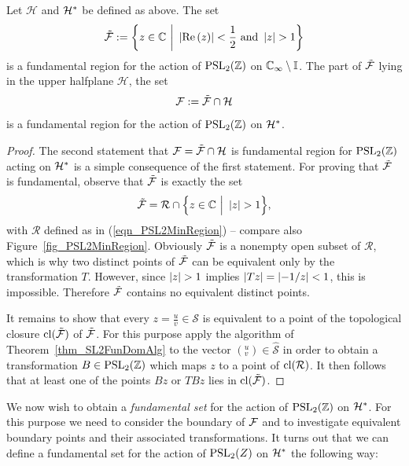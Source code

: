 \begin{theorem}
\label{thm_PSL2FunDom}
Let $\mathcal{H}$ and $\mathcal{H}^\ast$ be defined as above. The set
\begin{equation}
\tilde{\mathcal{F}} := \bigg\{ z \in \mathbb{C} \ \bigg| \ \left|\operatorname{Re}\left(z\right)\right| < \frac{1}{2} \text{ and } \left|z\right| > 1 \bigg\}
\end{equation}
is a fundamental region for the action of $\operatorname{PSL}_{2}(\mathbb{Z})$ on $\mathbb{C}_{\infty} \setminus \mathbb{I}$. The part of $\tilde{\mathcal{F}}$ lying in the upper halfplane $\mathcal{H}$, \ie the set
\begin{equation}
\label{eqn_PSL2FunDom}
\mathcal{F} := \tilde{\mathcal{F}} \cap \mathcal{H}
\end{equation}
is a fundamental region for the action of $\operatorname{PSL}_{2}(\mathbb{Z})$ on $\mathcal{H}^\ast$.
\end{theorem}
\begin{proof}
The second statement that $\mathcal{F} = \tilde{\mathcal{F}} \cap \mathcal{H}$ is fundamental region for $\operatorname{PSL}_{2}(\mathbb{Z})$ acting on $\mathcal{H}^\ast$ is a simple consequence of the first statement. For proving that $\tilde{\mathcal{F}}$ is fundamental,  observe that $\tilde{\mathcal{F}}$ is exactly the set
\begin{equation*}
\tilde{\mathcal{F}} = \mathcal{R} \cap \Big\{ z \in \mathbb{C} \ \Big| \ \left|z\right| > 1 \Big\},
\end{equation*}
with $\mathcal{R}$ defined as in (\ref{eqn_PSL2MinRegion}) -- compare also Figure~\ref{fig_PSL2MinRegion}. Obviously $\tilde{\mathcal{F}}$ is a nonempty open subset of $\mathcal{R}$, which is why two distinct points of $\tilde{\mathcal{F}}$ can be equivalent only by the transformation $T$. However, since $\left|z\right| > 1$ implies $\left|Tz\right| = \left|-1/z\right| < 1$, this is impossible. Therefore $\tilde{\mathcal{F}}$ contains no equivalent distinct points.

It remains to show that every $z = \frac{u}{v} \in \mathcal{S}$ is equivalent to a point of the topological closure $\operatorname{cl}(\tilde{\mathcal{F}})$ of $\tilde{\mathcal{F}}$. For this purpose apply the algorithm of Theorem~\ref{thm_SL2FunDomAlg} to the vector $({}^u_v) \in \hat{\mathcal{S}}$ in order to obtain a transformation $B \in \operatorname{PSL}_{2}(\mathbb{Z})$ which maps $z$ to a point of $\operatorname{cl}(\mathcal{R})$. It then follows that at least one of the points $Bz$ or $TBz$ lies in $\operatorname{cl}(\tilde{\mathcal{F}})$.
\end{proof}

We now wish to obtain a \emph{fundamental set} for the action of $\operatorname{PSL}_{2}(\mathbb{Z})$ on $\mathcal{H}^\ast$. For this purpose we need to consider the boundary of $\mathcal{F}$ and to investigate equivalent boundary points and their associated transformations. It turns out that we can define a fundamental set for the action of $\operatorname{PSL}_{2}(Z)$ on $\mathcal{H}^\ast$ the following way:

